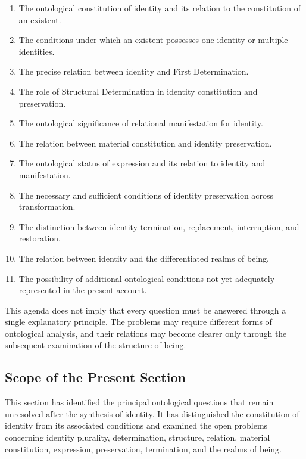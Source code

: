 \begin{enumerate}
    \item The ontological constitution of identity and
    its relation to the constitution of an existent.
    \item The conditions under which an existent possesses
    one identity or multiple identities.
    \item The precise relation between identity and
    First Determination.
    \item The role of Structural Determination in
    identity constitution and preservation.
    \item The ontological significance of relational
    manifestation for identity.
    \item The relation between material constitution
    and identity preservation.
    \item The ontological status of expression and
    its relation to identity and manifestation.
    \item The necessary and sufficient conditions of
    identity preservation across transformation.
    \item The distinction between identity termination,
    replacement, interruption, and restoration.
    \item The relation between identity and the
    differentiated realms of being.
    \item The possibility of additional ontological
    conditions not yet adequately represented in
    the present account.
\end{enumerate}

This agenda does not imply that every question must
be answered through a single explanatory principle.
The problems may require different forms of ontological
analysis, and their relations may become clearer only
through the subsequent examination of the structure
of being.


\subsection{Scope of the Present Section}

This section has identified the principal ontological
questions that remain unresolved after the synthesis
of identity. It has distinguished the constitution
of identity from its associated conditions and
examined the open problems concerning identity
plurality, determination, structure, relation,
material constitution, expression, preservation,
termination, and the realms of being.

